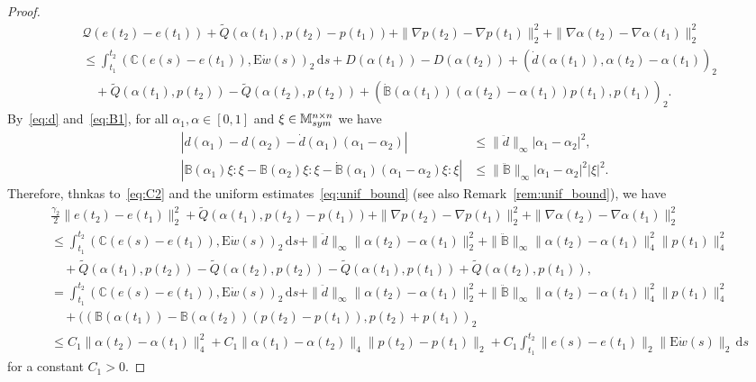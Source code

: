 \documentclass[reqno]{amsart}
\theoremstyle{definition}
\numberwithin{equation}{section}
\def\de {\mathrm{d}}
\def\M {\mathbb M^{n\times n}_{\rm sym}}
\def\C {\mathbb C}
\def\B {\mathbb B}
\def\EE {\mathrm{E}}
\begin{document}
\begin{proof}
\begin{align*}
&\mathcal Q(e(t_2)-e(t_1))+\tilde Q(\alpha(t_1),p(t_2)-p(t_1))+\|\nabla p(t_2)-\nabla p(t_1)\|_2^2+  \|\nabla \alpha(t_2)-\nabla \alpha(t_1)\|_2^2\\
&\le \int_{t_1}^{t_2}(\C (e(s)-e(t_1)),\EE \dot w(s))_2\,\de s+D(\alpha(t_1))-D(\alpha(t_2))+(\dot{d}(\alpha(t_1)),\alpha(t_2)-\alpha(t_1))_2\\
&\quad+\tilde Q(\alpha(t_1),p(t_2))-\tilde Q(\alpha(t_2),p(t_2))+(\dot{\B}(\alpha(t_1))(\alpha(t_2)-\alpha(t_1))p(t_1),p(t_1))_2.
\end{align*}
By~\eqref{eq:d} and~\eqref{eq:B1}, for all $\alpha_1,\alpha\in [0,1]$ and $\xi\in\M$ we have
\begin{align*}
|d(\alpha_1)-d(\alpha_2)-\dot{d}(\alpha_1)(\alpha_1-\alpha_2)| &\le \|\ddot{d}\|_\infty|\alpha_1-\alpha_2|^2,\\
|\B(\alpha_1)\xi:\xi-\B(\alpha_2)\xi:\xi-\dot{\B}(\alpha_1)(\alpha_1-\alpha_2)\xi:\xi| &\le \|\ddot{\B}\|_\infty|\alpha_1-\alpha_2|^2|\xi|^2.
\end{align*}
Therefore, thnkas to~\eqref{eq:C2} and the uniform estimates~\eqref{eq:unif_bound} (see also Remark~\ref{rem:unif_bound}), we have
\begin{align}
&\frac{\gamma_2}{2}\|e(t_2)-e(t_1)\|_2^2+\tilde Q(\alpha(t_1),p(t_2)-p(t_1))+\|\nabla p(t_2)-\nabla p(t_1)\|_2^2+  \|\nabla \alpha(t_2)-\nabla \alpha(t_1)\|_2^2\nonumber\\
&\le \int_{t_1}^{t_2}(\C (e(s)-e(t_1)),\EE \dot w(s))_2\,\de s+\|\ddot{d}\|_\infty\|\alpha(t_2)-\alpha(t_1)\|_2^2+\|\ddot{\B}\|_\infty\|\alpha(t_2)-\alpha(t_1)\|_4^2\|p(t_1)\|_4^2\nonumber\\
&\quad+\tilde Q(\alpha(t_1),p(t_2))-\tilde Q(\alpha(t_2),p(t_2))-\tilde Q(\alpha(t_1),p(t_1))+\tilde Q(\alpha(t_2),p(t_1)),\nonumber\\
&=\int_{t_1}^{t_2}(\C (e(s)-e(t_1)),\EE \dot w(s))_2\,\de s+\|\ddot{d}\|_\infty\|\alpha(t_2)-\alpha(t_1)\|_2^2+\|\ddot{\B}\|_\infty\|\alpha(t_2)-\alpha(t_1)\|_4^2\|p(t_1)\|_4^2\nonumber\\
&\quad+((\B(\alpha(t_1))-\B(\alpha(t_2))(p(t_2)-p(t_1)),p(t_2)+p(t_1))_2\nonumber\\
&\le C_1\|\alpha(t_2)-\alpha(t_1)\|_4^2+C_1\|\alpha(t_1)-\alpha(t_2)\|_4\|p(t_2)-p(t_1)\|_2+C_1\int_{t_1}^{t_2}\|e(s)-e(t_1)\|_2\|\EE \dot w(s)\|_2\,\de s\label{eq:part1}
\end{align}
for a constant $C_1>0$.


\end{proof}
\end{document}
